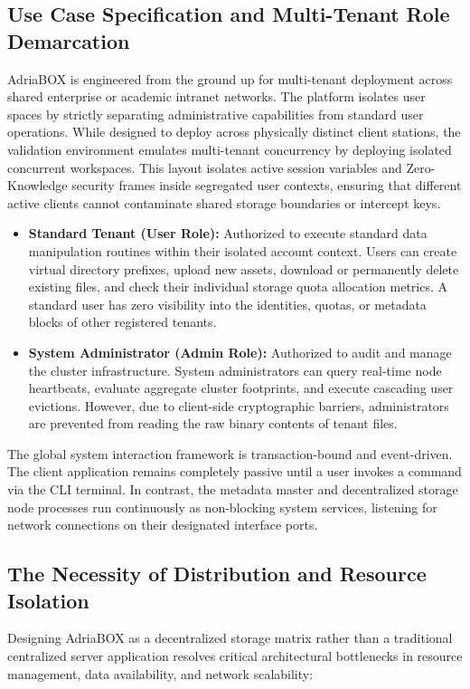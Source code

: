 \subsection{Use Case Specification and Multi-Tenant Role Demarcation}
AdriaBOX is engineered from the ground up for multi-tenant deployment across shared enterprise or academic intranet networks. The platform isolates user spaces by strictly separating administrative capabilities from standard user operations. While designed to deploy across physically distinct client stations, the validation environment emulates multi-tenant concurrency by deploying isolated concurrent workspaces. This layout isolates active session variables and Zero-Knowledge security frames inside segregated user contexts, ensuring that different active clients cannot contaminate shared storage boundaries or intercept keys.
\begin{itemize}
    \item \textbf{Standard Tenant (User Role):} Authorized to execute standard data manipulation routines within their isolated account context. Users can create virtual directory prefixes, upload new assets, download or permanently delete existing files, and check their individual storage quota allocation metrics. A standard user has zero visibility into the identities, quotas, or metadata blocks of other registered tenants.
    \item \textbf{System Administrator (Admin Role):} Authorized to audit and manage the cluster infrastructure. System administrators can query real-time node heartbeats, evaluate aggregate cluster footprints, and execute cascading user evictions. However, due to client-side cryptographic barriers, administrators are prevented from reading the raw binary contents of tenant files.
\end{itemize}

The global system interaction framework is transaction-bound and event-driven. The client application remains completely passive until a user invokes a command via the CLI terminal. In contrast, the metadata master and decentralized storage node processes run continuously as non-blocking system services, listening for network connections on their designated interface ports.

\subsection{The Necessity of Distribution and Resource Isolation}
Designing AdriaBOX as a decentralized storage matrix rather than a traditional centralized server application resolves critical architectural bottlenecks in resource management, data availability, and network scalability:

